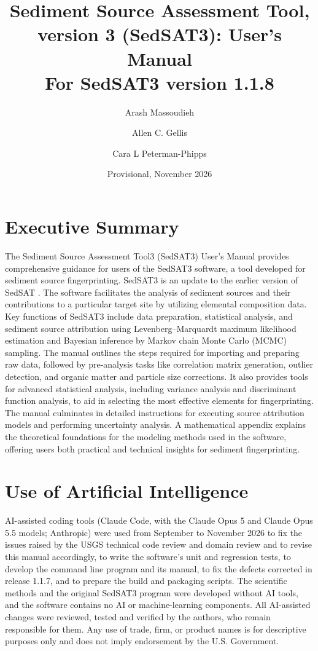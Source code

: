 \documentclass[12pt]{report}
\title{Sediment Source Assessment Tool, version 3 (SedSAT3): User's Manual\\[0.6em]
\large For SedSAT3 version 1.1.8}
\author{Arash Massoudieh
    \and
    Allen C. Gellis
    \and
    Cara L Peterman-Phipps }
\date{Provisional, November 2026}
\begin{document}
\sloppy
\setlength{\emergencystretch}{3em}


\maketitle

\section*{Executive Summary}
The Sediment Source Assessment Tool3 (SedSAT3) User’s Manual provides comprehensive guidance for users of the SedSAT3 software, a tool developed for sediment source fingerprinting. SedSAT3 is an update to the earlier version of SedSAT \citep{gormansanisaca2017determining}. The software facilitates the analysis of sediment sources and their contributions to a particular target site by utilizing elemental composition data. Key functions of SedSAT3 include data preparation, statistical analysis, and sediment source attribution using Levenberg--Marquardt maximum likelihood estimation and Bayesian inference by Markov chain Monte Carlo (MCMC) sampling. The manual outlines the steps required for importing and preparing raw data, followed by pre-analysis tasks like correlation matrix generation, outlier detection, and organic matter and particle size corrections. It also provides tools for advanced statistical analysis, including variance analysis and discriminant function analysis, to aid in selecting the most effective elements for fingerprinting. The manual culminates in detailed instructions for executing source attribution models and performing uncertainty analysis. A mathematical appendix explains the theoretical foundations for the modeling methods used in the software, offering users both practical and technical insights for sediment fingerprinting.

\section*{Use of Artificial Intelligence}
AI-assisted coding tools (Claude Code, with the Claude Opus 5 and Claude Opus 5.5 models; Anthropic) were used from September to November 2026 to fix the issues raised by the USGS technical code review and domain review and to revise this manual accordingly, to write the software's unit and regression tests, to develop the command line program and its manual, to fix the defects corrected in release 1.1.7, and to prepare the build and packaging scripts. The scientific methods and the original SedSAT3 program were developed without AI tools, and the software contains no AI or machine-learning components. All AI-assisted changes were reviewed, tested and verified by the authors, who remain responsible for them. Any use of trade, firm, or product names is for descriptive purposes only and does not imply endorsement by the U.S. Government.
\end{document}

